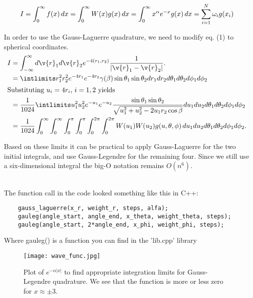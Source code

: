 \documentclass{article}
\begin{document}
\begin{align}
  \notag I = \int_0^\infty f(x) \, dx = \int_0^\infty W(x)g(x) \, dx =
  \int_0^\infty x^\alpha e^{-x} g(x) \, dx = \sum^{N}_{i=1} \omega_ig(x_i)
\end{align}

In order to use the Gauss-Laguerre quadrature, we need to modify eq. (1)
to spherical coordinates. 
\begin{align*}
  I &= \int_{-\infty}^{\infty} d\v{r}_1d\v{r}_2 e^{-4(r_1, r_2)} \frac{1}{\left| \v{r}_1 - \v{r}_2 \right|}.\\
    &= \intlimits r_1^2r_2^2e^{-4r_1} e^{-4r_2} \gamma(\beta)\sin\theta_1\sin\theta_2 dr_1dr_2d\theta_1d\theta_2d\phi_1d\phi_2\\
  \intertext{Substituting $u_i = 4r_i$, $i = 1, 2$ yields}
  &= \frac{1}{1024}\intlimits u_1^2u_2^2e^{-u_1}e^{-u_2} \frac{\sin\theta_1\sin\theta_2}{\sqrt{u_1^2 + u_2^2 - 2u_1r_2\cos\beta}} du_1du_2d\theta_1d\theta_2d\phi_1d\phi_2\\
    &=\frac{1}{1024} \int_{0}^\infty\int_0^\infty\int_0^{\pi}\int_0^\pi\int_0^{2\pi}\int_0^{2\pi}W(u_1)W(u_2)g(u, \theta, \phi)\,du_1du_2d\theta_1d\theta_2d\phi_1d\phi_2.
\end{align*}

Based on these limits it can be practical to apply Gauss-Laguerre  for
the two initial integrals, and use Gauss-Legendre for the remaining four.
Since we still use a six-dimensional integral the big-O notation remains $O(n^6)$.\\\

The function call in the code looked something like this in C++:
\begin{lstlisting}
    gauss_laguerre(x_r, weight_r, steps, alfa);
    gauleg(angle_start, angle_end, x_theta, weight_theta, steps);
    gauleg(angle_start, 2*angle_end, x_phi, weight_phi, steps);
\end{lstlisting}

Where gauleg() is a function you can find in the 'lib.cpp' library

\begin{figure}[H]
    \centering
	\texttt{[image: wave\_func.jpg]}
	\caption{Plot of $e^{-\alpha |x|}$ to find appropriate integration limits for Gauss-Legendre quadrature. We see that the function is more or less zero for $x\approx \pm3$.}
	\label{fig: integration limits Gauss-Legendre}
\end{figure} 
\end{document}
